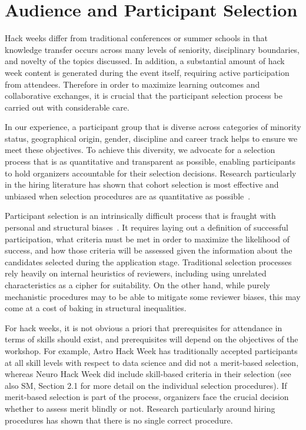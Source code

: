 \section*{Audience and Participant Selection}

Hack weeks differ from traditional conferences or summer schools in that knowledge transfer occurs across many levels of seniority, disciplinary boundaries, and novelty of the topics discussed.
In addition, a substantial amount of hack week content is generated during the event itself, requiring active participation from attendees.
Therefore in order to maximize learning outcomes and collaborative exchanges, it is crucial that the participant selection process be carried out with considerable care.

In our experience, a participant group that is diverse across categories of minority status, geographical origin, gender, discipline and career track helps to ensure we meet these objectives.
To achieve this diversity, we advocate for a selection process that is as quantitative and transparent as possible, enabling participants to hold organizers accountable for their selection decisions.
Research particularly in the hiring literature has shown that cohort selection is most effective and unbiased when selection procedures are as quantitative as possible~\cite{sunstein2015wiser}. 

Participant selection is an intrinsically difficult process that is fraught with personal and structural biases~\cite[e.g.][]{sunstein2015wiser}. It requires laying out a definition of successful participation, what criteria must be met in order to maximize the likelihood of success, and how those criteria will be assessed given the information about the candidates selected during the application stage.  
Traditional selection processes rely heavily on internal heuristics of reviewers, including using unrelated characteristics as a cipher for suitability. On the other hand, while purely mechanistic procedures may to be able to mitigate some reviewer biases, this may come at a cost of baking in structural inequalities. 

For hack weeks, it is not obvious a priori that prerequisites for attendance in terms of skills should exist, and prerequisites will depend on the objectives of the workshop. For example, Astro Hack Week has traditionally accepted participants at all skill levels with respect to data science and did not a merit-based selection, whereas Neuro Hack Week did include skill-based criteria in their selection (see also SM, Section 2.1 for more detail on the individual selection procedures). If merit-based selection is part of the process, organizers face the crucial decision whether to assess merit blindly or not. Research particularly around hiring procedures has shown that there is no single correct procedure. 

